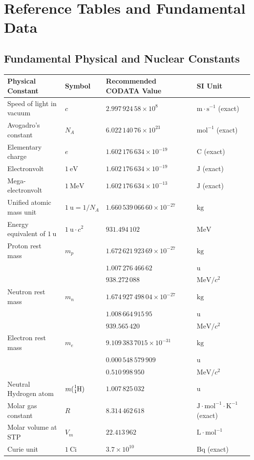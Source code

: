 \chapter{Reference Tables and Fundamental Data}
\label{app:tables}

\section{Fundamental Physical and Nuclear Constants}

\renewcommand{\arraystretch}{1.25}
\begin{longtable}{@{}llll@{}}
\toprule
\textbf{Physical Constant} & \textbf{Symbol} & \textbf{Recommended CODATA Value} & \textbf{SI Unit} \\
\midrule
\endhead
Speed of light in vacuum & $c$ & $2.997\,924\,58 \times 10^8$ & $\mathrm{m\cdot s^{-1}}$ (exact) \\
Avogadro's constant & $N_A$ & $6.022\,140\,76 \times 10^{23}$ & $\mathrm{mol^{-1}}$ (exact) \\
Elementary charge & $e$ & $1.602\,176\,634 \times 10^{-19}$ & $\mathrm{C}$ (exact) \\
Electronvolt & $1\ \mathrm{eV}$ & $1.602\,176\,634 \times 10^{-19}$ & $\mathrm{J}$ (exact) \\
Mega-electronvolt & $1\ \mathrm{MeV}$ & $1.602\,176\,634 \times 10^{-13}$ & $\mathrm{J}$ (exact) \\
Unified atomic mass unit & $1\ \mathrm{u} = 1/N_A$ & $1.660\,539\,066\,60 \times 10^{-27}$ & $\mathrm{kg}$ \\
Energy equivalent of $1\ \mathrm{u}$ & $1\ \mathrm{u} \cdot c^2$ & $931.494\,102$ & $\mathrm{MeV}$ \\
Proton rest mass & $m_p$ & $1.672\,621\,923\,69 \times 10^{-27}$ & $\mathrm{kg}$ \\
& & $1.007\,276\,466\,62$ & $\mathrm{u}$ \\
& & $938.272\,088$ & $\mathrm{MeV}/c^2$ \\
Neutron rest mass & $m_n$ & $1.674\,927\,498\,04 \times 10^{-27}$ & $\mathrm{kg}$ \\
& & $1.008\,664\,915\,95$ & $\mathrm{u}$ \\
& & $939.565\,420$ & $\mathrm{MeV}/c^2$ \\
Electron rest mass & $m_e$ & $9.109\,383\,7015 \times 10^{-31}$ & $\mathrm{kg}$ \\
& & $0.000\,548\,579\,909$ & $\mathrm{u}$ \\
& & $0.510\,998\,950$ & $\mathrm{MeV}/c^2$ \\
Neutral Hydrogen atom & $m(\ce{^1_1H})$ & $1.007\,825\,032$ & $\mathrm{u}$ \\
Molar gas constant & $R$ & $8.314\,462\,618$ & $\mathrm{J\cdot mol^{-1}\cdot K^{-1}}$ (exact) \\
Molar volume at STP & $V_m$ & $22.413\,962$ & $\mathrm{L\cdot mol^{-1}}$ \\
Curie unit & $1\ \mathrm{Ci}$ & $3.7 \times 10^{10}$ & $\mathrm{Bq}$ (exact) \\
\bottomrule
\end{longtable}


